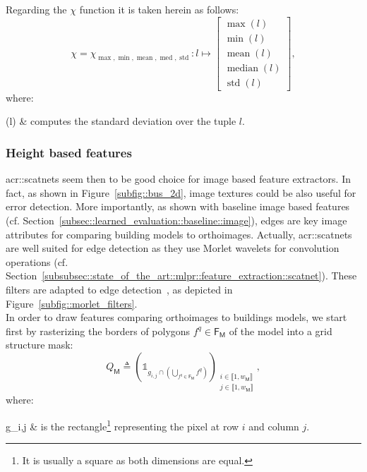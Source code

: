             Regarding the \(\chi\) function it is taken herein as follows:
            \begin{equation}
                \label{eq::max_min_mean_med_std_extractor}
                \chi = \chi_{\max,\min,\operatorname{mean},\operatorname{med},\operatorname{std}}: l \mapsto \begin{bmatrix}
                    \max(l)\\
                    \min(l)\\
                    \operatorname{mean}(l)\\
                    \operatorname{median}(l)\\
                    \operatorname{std}(l)
                \end{bmatrix},
            \end{equation}
            where:
            \begin{conditions}
                (l) & computes the standard deviation over the tuple \(l\).
            \end{conditions}

        \subsubsection{Height based features}
            \glspl{acr::scatnet} seem then to be good choice for image based feature extractors.
            In fact, as shown in Figure~\ref{subfig::bus_2d}, image textures could be also useful for error detection.
            More importantly, as shown with baseline image based features (cf. Section~\ref{subsec::learned_evaluation::baseline::image}), edges are key image attributes for comparing building models to orthoimages.
            Actually, \glspl{acr::scatnet} are well suited for edge detection as they use Morlet wavelets for convolution operations (cf. Section~\ref{subsubsec::state_of_the_art::mlpr::feature_extraction::scatnet}).
            These filters are adapted to edge detection~\parencite{zhang2007radon}, as depicted in Figure~\ref{subfig::morlet_filters}.\\

            In order to draw features comparing orthoimages to buildings models, we start first by rasterizing the borders of polygons \(f^q \in \mathsf{F_M}\) of the model into a grid structure mask:
            \begin{equation}
                \label{eq::borders_mask}
                Q_{\mathsf{M}} \triangleq \left(\mathbb{1}_{g_{i,j} \cap \left(\bigcup_{f^q \in \mathsf{F_M}}f^q\right)}\right)_{\substack{i \in \llbracket 1, w_\mathsf{M} \rrbracket\\j \in \llbracket 1, w_\mathsf{M} \rrbracket}},
            \end{equation}
            where:
            \begin{conditions}
                g_{i,j} & is the rectangle\footnote{It is usually a square as both dimensions are equal.} representing the pixel at row \(i\) and column \(j\).
            \end{conditions}

